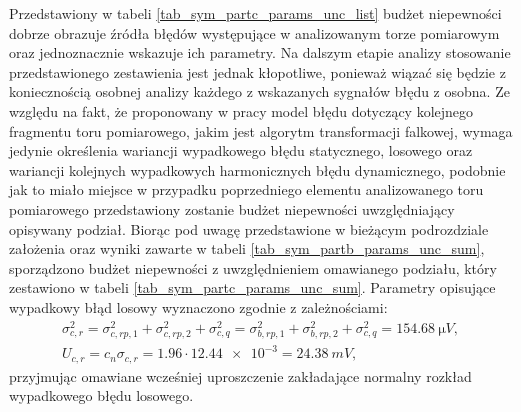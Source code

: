 Przedstawiony w tabeli \ref{tab_sym_partc_params_unc_list} budżet niepewności dobrze obrazuje źródła błędów występujące w analizowanym torze pomiarowym oraz jednoznacznie wskazuje ich parametry. Na dalszym etapie analizy stosowanie przedstawionego zestawienia jest jednak kłopotliwe, ponieważ wiązać się będzie z koniecznością osobnej analizy każdego z wskazanych sygnałów błędu z osobna. Ze względu na fakt, że proponowany w pracy model błędu dotyczący kolejnego fragmentu toru pomiarowego, jakim jest algorytm transformacji falkowej, wymaga jedynie określenia wariancji wypadkowego błędu statycznego, losowego oraz wariancji kolejnych wypadkowych harmonicznych błędu dynamicznego, podobnie jak to miało miejsce w przypadku poprzedniego elementu analizowanego toru pomiarowego przedstawiony zostanie budżet niepewności uwzględniający opisywany podział. Biorąc pod uwagę przedstawione w bieżącym podrozdziale założenia oraz wyniki zawarte w tabeli \ref{tab_sym_partb_params_unc_sum}, sporządzono budżet niepewności z uwzględnieniem omawianego podziału, który zestawiono w tabeli \ref{tab_sym_partc_params_unc_sum}. Parametry opisujące wypadkowy błąd losowy wyznaczono zgodnie z zależnościami:
\begin{gather}
\sigma_{c,r}^{2} = \sigma_{c,rp,1}^{2} + \sigma_{c,rp,2}^{2} + \sigma_{c,q}^{2} = \sigma_{b,rp,1}^{2} + \sigma_{b,rp,2}^{2} + \sigma_{c,q}^{2} = \qty{154.68}{\micro V} \label{eqn_sym_partc_var_random}, \\
U_{c,r} = c_{n} \sigma_{c,r} = 1.96 \cdot \num{12.44e-3} = \qty{24.38}{mV} \label{eqn_sym_partc_uncert_random},
\end{gather}
przyjmując omawiane wcześniej uproszczenie zakładające normalny rozkład wypadkowego błędu losowego.

